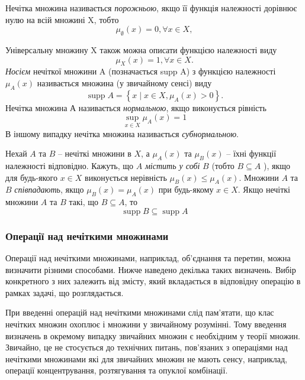 \documentclass[14pt, a4paper, oneside]{extarticle}
\numberwithin{equation}{section}
\begin{document}
Нечітка множина називається \textit{порожньою}, якщо її функція належності дорівнює нулю на всій множині X, тобто
\begin{equation}
    \mu_\emptyset (x) = 0, \forall x \in X,
\end{equation}

Універсальну множину X також можна описати функцією належності виду
\begin{equation}
\mu_X (x) = 1, \forall x \in X.
\end{equation}
\textit{Носієм} нечіткої множини A (позначається supp A) з функцією належності $\mu_A (x)$ називається множина (у звичайному сенсі) виду
\begin{equation}
\operatorname{supp} A=\left\{x \mid x \in X, \mu_A(x)>0\right\} .
\end{equation}
Нечітка множина А називається \textit{нормальною}, якщо виконується рівність
\begin{equation}
\sup _{x \in X} \mu_A(x)=1
\end{equation}
В іншому випадку нечітка множина називається \textit{субнормальною}.

Нехай $A$ та $B$ -- нечіткі множини в $X$, а $\mu_{A}(x)$ та $\mu_B(x)$ -- їхні функції належності відповідно. Кажуть, що $A$ \textit{містить у собі} $B$ (тобто $B \subseteq A$ ), якщо для будь-якого $x \in X$ виконується нерівність $\mu_B(x) \leq \mu_A(x)$. Множини $A$ та $B$ \textit{співпадають}, якщо $\mu_B(x)=\mu_A(x)$ при будь-якому $x \in X$. Якщо нечіткі множини $A$ та $B$ такі, що $B \subseteq A$, то
\begin{equation}
\operatorname{supp} B \subseteq \operatorname{supp} A\end{equation}

\subsubsection{Операції над нечіткими множинами}
Операції над нечіткими множинами, наприклад, об'єднання та перетин, можна визначити різними способами. Нижче наведено декілька таких визначень. Вибір конкретного з них залежить від змісту, який вкладається в відповідну операцію в рамках задачі, що розглядається.

При введенні операцій над нечіткими множинами слід пам'ятати, що клас нечітких множин охоплює і множини у звичайному розумінні. Тому введення визначень в окремому випадку звичайних множин є необхідним у теорії множин. Звичайно, це не стосується до технічних питань, пов'язаних з операціями над нечіткими множинами які для звичайних множин не мають сенсу, наприклад, операції концентрування, розтягування та опуклої комбінації.
\end{document}

